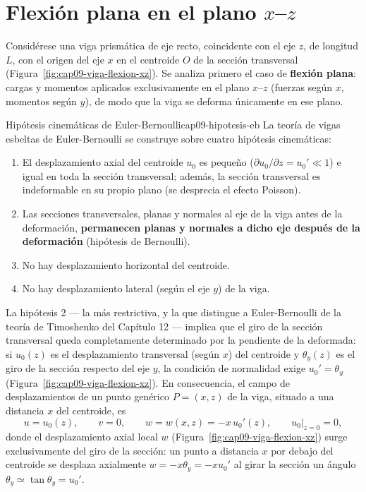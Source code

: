 \section{Flexión plana en el plano \texorpdfstring{$x$--$z$}{x-z}}
\label{sec:cap09-flexion-xz}

Considérese una viga prismática de eje recto, coincidente con el eje $z$, de longitud $L$, con el origen del eje $x$ en el centroide $O$ de la sección transversal (Figura~\ref{fig:cap09-viga-flexion-xz}). Se analiza primero el caso de \textbf{flexión plana}: cargas y momentos aplicados exclusivamente en el plano $x$--$z$ (fuerzas según $x$, momentos según $y$), de modo que la viga se deforma únicamente en ese plano.

\begin{definicion}{Hipótesis cinemáticas de Euler-Bernoulli}{cap09-hipotesis-eb}
La teoría de vigas esbeltas de Euler-Bernoulli se construye sobre cuatro hipótesis cinemáticas:
\begin{enumerate}[leftmargin=1.8em]
  \item El desplazamiento axial del centroide $u_0$ es pequeño ($\partial u_0/\partial z = u_0'\ll1$) e igual en toda la sección transversal; además, la sección transversal es indeformable en su propio plano (se desprecia el efecto Poisson).
  \item Las secciones transversales, planas y normales al eje de la viga antes de la deformación, \textbf{permanecen planas y normales a dicho eje después de la deformación} (hipótesis de Bernoulli).
  \item No hay desplazamiento horizontal del centroide.
  \item No hay desplazamiento lateral (según el eje $y$) de la viga.
\end{enumerate}
\end{definicion}

La hipótesis 2 --- la más restrictiva, y la que distingue a Euler-Bernoulli de la teoría de Timoshenko del Capítulo 12 --- implica que el giro de la sección transversal queda completamente determinado por la pendiente de la deformada: si $u_0(z)$ es el desplazamiento transversal (según $x$) del centroide y $\theta_y(z)$ es el giro de la sección respecto del eje $y$, la condición de normalidad exige $u_0'=\theta_y$ (Figura~\ref{fig:cap09-viga-flexion-xz}). En consecuencia, el campo de desplazamientos de un punto genérico $P=(x,z)$ de la viga, situado a una distancia $x$ del centroide, es
\[
u = u_0(z), \qquad v=0, \qquad w = w(x,z) = -x\,u_0'(z), \qquad u_0\big|_{z=0}=0 ,
\]
donde el desplazamiento axial local $w$ (Figura~\ref{fig:cap09-viga-flexion-xz}) surge exclusivamente del giro de la sección: un punto a distancia $x$ por debajo del centroide se desplaza axialmente $w=-x\theta_y=-x u_0'$ al girar la sección un ángulo $\theta_y\simeq\tan\theta_y=u_0'$.

